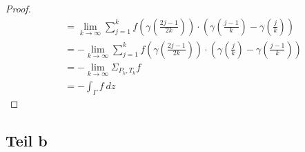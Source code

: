 \documentclass[10pt,a4paper]{article}
\begin{document}
\begin{proof}
\begin{align*}
                         & = \lim_{k \to \infty} \sum_{j = 1}^{k} f\left( \gamma\left( \frac{2j - 1}{2k} \right) \right) \cdot \left( \gamma\left( \frac{j - 1}{k} \right) - \gamma\left( \frac{j}{k} \right) \right)\\
                         & = -\lim_{k \to \infty} \sum_{j = 1}^{k} f\left( \gamma\left( \frac{2j - 1}{2k} \right) \right) \cdot \left( \gamma\left( \frac{j}{k} \right) - \gamma\left( \frac{j - 1}{k} \right) \right)\\
                         & = -\lim_{k \to \infty} \Sigma_{P_{k},T_{k}} f\\
                         & = -\int_{\Gamma} f\ dz
  \end{align*}
\end{proof}

\subsection{Teil b}
\end{document}
